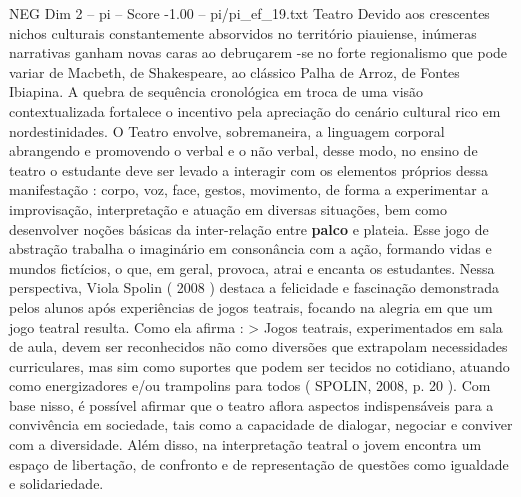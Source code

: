 \begin{textsample}{NEG Dim 2 – pi – Score -1.00 – pi/pi\_ef\_19.txt}  \label{ex:f2_neg_191}
Teatro Devido aos crescentes nichos culturais constantemente absorvidos no território piauiense, inúmeras narrativas ganham novas caras ao debruçarem -se no forte regionalismo que pode variar de Macbeth, de Shakespeare, ao clássico Palha de Arroz, de Fontes Ibiapina.
A quebra de sequência cronológica em troca de uma visão contextualizada fortalece o incentivo pela apreciação do cenário cultural rico em nordestinidades.
O Teatro envolve, sobremaneira, a linguagem corporal abrangendo e promovendo o verbal e o não verbal, desse modo, no ensino de teatro o estudante deve ser levado a interagir com os elementos próprios dessa manifestação : corpo, voz, face, gestos, movimento, de forma a experimentar a improvisação, interpretação e atuação em diversas situações, bem como desenvolver noções básicas da inter-relação entre \textbf{palco} e plateia.
Esse jogo de abstração trabalha o imaginário em consonância com a ação, formando vidas e mundos fictícios, o que, em geral, provoca, atrai e encanta os estudantes.
Nessa perspectiva, Viola Spolin ( 2008 ) destaca a felicidade e fascinação demonstrada pelos alunos após experiências de jogos teatrais, focando na alegria em que um jogo teatral resulta.
Como ela afirma : > Jogos teatrais, experimentados em sala de aula, devem ser reconhecidos não como diversões que extrapolam necessidades curriculares, mas sim como suportes que podem ser tecidos no cotidiano, atuando como energizadores e/ou trampolins para todos ( SPOLIN, 2008, p. 20 ).
Com base nisso, é possível afirmar que o teatro aflora aspectos indispensáveis para a convivência em sociedade, tais como a capacidade de dialogar, negociar e conviver com a diversidade.
Além disso, na interpretação teatral o jovem encontra um espaço de libertação, de confronto e de representação de questões como igualdade e solidariedade.

\end{textsample}
